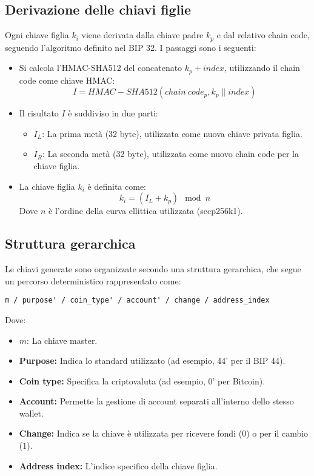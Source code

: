 \documentclass{article}
\begin{document}
\subsection{Derivazione delle chiavi figlie}
Ogni chiave figlia \(k_i\) viene derivata dalla chiave padre \(k_p\) e dal relativo chain code, seguendo l'algoritmo definito nel BIP 32. I passaggi sono i seguenti:
\begin{itemize}
    \item Si calcola l'HMAC-SHA512 del concatenato \(k_p + index\), utilizzando il chain code come chiave HMAC:
    \[
    I = HMAC-SHA512(chain\ code_p, k_p \parallel index)
    \]
    \item Il risultato \(I\) è suddiviso in due parti:
    \begin{itemize}
        \item \(I_L\): La prima metà (32 byte), utilizzata come nuova chiave privata figlia.
        \item \(I_R\): La seconda metà (32 byte), utilizzata come nuovo chain code per la chiave figlia.
    \end{itemize}
    \item La chiave figlia \(k_i\) è definita come:
    \[
    k_i = (I_L + k_p) \mod n
    \]
    Dove \(n\) è l'ordine della curva ellittica utilizzata (secp256k1).
\end{itemize}

\subsection{Struttura gerarchica}
Le chiavi generate sono organizzate secondo una struttura gerarchica, che segue un percorso deterministico rappresentato come:
\begin{verbatim}
m / purpose' / coin_type' / account' / change / address_index
\end{verbatim}
Dove:
\begin{itemize}
    \item \(m\): La chiave master.
    \item \textbf{Purpose:} Indica lo standard utilizzato (ad esempio, 44' per il BIP 44).
    \item \textbf{Coin type:} Specifica la criptovaluta (ad esempio, 0' per Bitcoin).
    \item \textbf{Account:} Permette la gestione di account separati all'interno dello stesso wallet.
    \item \textbf{Change:} Indica se la chiave è utilizzata per ricevere fondi (\(0\)) o per il cambio (\(1\)).
    \item \textbf{Address index:} L'indice specifico della chiave figlia.
\end{itemize}
\end{document}
